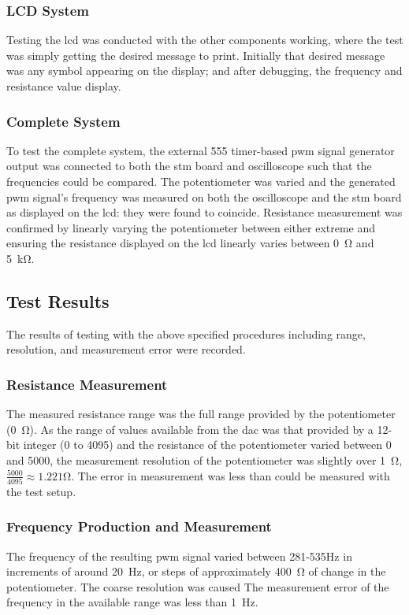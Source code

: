 \subsubsection{LCD System}
Testing the \gls{lcd} was conducted with the other components working,
where the test was simply getting the desired message to print.
Initially that desired message was any symbol appearing on the display;
and after debugging, the frequency and resistance value display.

\subsubsection{Complete System}
To test the complete system, the external 555 timer-based \gls{pwm} signal
generator output was connected to both the \gls{stm} board and oscilloscope
such that the frequencies could be compared. The potentiometer was
varied and the generated \gls{pwm} signal's frequency was measured on
both the oscilloscope and the \gls{stm} board as displayed on the
\gls{lcd}: they were found to coincide. Resistance measurement was
confirmed by linearly varying the potentiometer between either extreme
and ensuring the resistance displayed on the \gls{lcd} linearly varies
between \SI{0}{\ohm} and \SI{5}{\kilo\ohm}.


\subsection{Test Results} The results of testing with the above
specified procedures including range, resolution, and measurement error
were recorded.

\subsubsection{Resistance Measurement}
The measured resistance range was the full range provided by the
potentiometer (\SI{0}{\ohm}). As the range of values available from the
\gls{dac} was that provided by a 12-bit integer (0 to 4095) and the
resistance of the potentiometer varied between 0 and 5000, the
measurement resolution of the potentiometer was slightly over
\SI{1}{\ohm}, $\frac{5000}{4095}\approx1.221$\si{\ohm}. The error in
measurement was less than could be measured with the test setup.

\subsubsection{Frequency Production and Measurement}
The frequency of the resulting \gls{pwm} signal varied between
281-535\si{\hertz} in increments of around \SI{20}{\hertz}, or steps of
approximately \SI{400}{\ohm} of change in the potentiometer. The coarse
resolution was caused The measurement error of the frequency in the
available range was less than \SI{1}{\hertz}.

